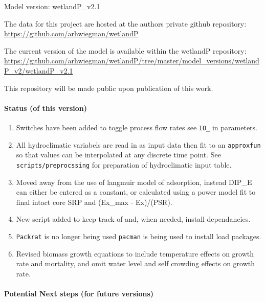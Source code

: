 \documentclass[
]{article}
\providecommand{\tightlist}{%
  \setlength{\itemsep}{0pt}\setlength{\parskip}{0pt}}
\begin{document}
Model version: wetlandP\_v2.1

The data for this project are hosted at the authors private github
repository: \url{https://github.com/arhwiegman/wetlandP}

The current version of the model is available within the wetlandP
repository:
\url{https://github.com/arhwiegman/wetlandP/tree/master/model_versions/wetlandP_v2/wetlandP_v2.1}

This repository will be made public upon publication of this work.

\hypertarget{status-of-this-version}{%
\paragraph{Status (of this version)}\label{status-of-this-version}}

\begin{enumerate}
\def\labelenumi{\arabic{enumi}.}
\tightlist
\item
  Switches have been added to toggle process flow rates see
  \texttt{IO\_} in parameters.
\item
  All hydroclimatic variabels are read in as input data then fit to an
  \texttt{approxfun} so that values can be interpolated at any discrete
  time point. See \texttt{scripts/preprocssing} for preparation of
  hydroclimatic input table.\\
\item
  Moved away from the use of langmuir model of adsorption, instead
  DIP\_E can either be entered as a constant, or calculated using a
  power model fit to final intact core SRP and (Ex\_max - Ex)/(PSR).
\item
  New script added to keep track of and, when needed, install
  dependancies.
\item
  \texttt{Packrat} is no longer being used \texttt{pacman} is being used
  to install load packages.
\item
  Revised biomass growth equations to include temperature effects on
  growth rate and mortality, and omit water level and self crowding
  effects on growth rate.
\end{enumerate}

\hypertarget{potential-next-steps-for-future-versions}{%
\paragraph{Potential Next steps (for future
versions)}\label{potential-next-steps-for-future-versions}}
\end{document}
